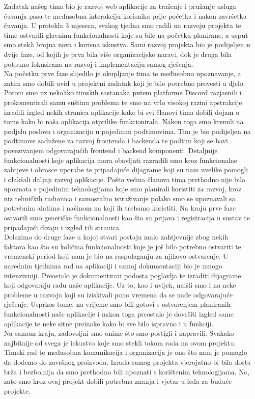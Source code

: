 		Zadatak našeg tima bio je razvoj web aplikacije za traženje i pružanje usluga čuvanja pasa te međusobnu interakciju korisnika prije početka i nakon završetka čuvanja. U protekla 3 mjeseca, svakog tjedna smo radili na razvoju projekta te time ostvarili glavninu funkcionalnosti koje su bile na početku planirane, a usput smo stekli brojna nova i korisna iskustva. Sami razvoj projekta bio je podijeljen u dvije faze, od kojih je prva bila više organizacijske naravi, dok je druga bila potpuno fokusirana na razvoj i implementaciju samog rješenja.\\
		Na početku prve faze slijedilo je okupljanje tima te međusobno upoznavanje, a zatim smo dobili uvid u projektni zadatak koji je bilo potrebno provesti u djelo. Potom smo uz nekoliko timskih sastanaka putem platforme Discord razjasnili i prokomentirali samu suštinu problema te smo na vrlo visokoj razini apstrakcije izradili izgled nekih stranica aplikacije kako bi svi članovi tima dobili dojam o tome kako bi naša aplikacija otprilike funkcionirala. Nakon toga smo krenuli na podjelu poslova i organizaciju u pojedinim podtimovima. Tim je bio podijeljen na podtimove zadužene za razvoj frontenda i backenda te podtim koji se bavi povezivanjem odgovarajućih frontend i backend komponenti. Detaljnije funkcionalnosti koje aplikacija mora obavljati razradili smo kroz funkcionalne zahtjeve i obrasce uporabe te pripadajuće dijagrame koji su nam uvelike pomogli i olakšali daljnji razvoj aplikacije. Pošto većina članova tima prethodno nije bila upoznata s pojedinim tehnologijama koje smo planirali koristiti za razvoj, kroz niz tehničkih radionica i samostalno istraživanje polako smo se upoznavali sa potrebnim alatima i načinom na koji ih trebamo koristiti. Na kraju prve faze ostvarili smo generičke funkcionalnosti kao što su prijava i registracija u sustav te pripadajući dizajn i izgled tih stranica.\\
		Dolazimo do druge faze u kojoj stvari postaju malo zahtjevnije zbog nekih faktora kao što su količina funkcionalnosti koje je još bilo potrebno ostvariti te vremenski period koji nam je bio na raspolaganju za njihovo ostvarenje. U narednim tjednima rad na aplikaciji i samoj dokumentaciji bio je mnogo intenzivniji. Preostalo je dokumentirati podosta poglavlja te izraditi dijagrame koji odgovaraju radu naše aplikacije. Uz to, kao i uvijek, naišli smo i na neke probleme u razvoju koji su iziskivali puno vremena da se nađe odgovarajuće rješenje. Usprkos tome, na vrijeme smo bili gotovi s ostvarenjem planiranih funkcionalnosti naše aplikacije i nakon toga preostalo je dovršiti izgled same aplikacije te neke sitne preinake kako bi sve bilo ispravno i u funkciji.\\
		Na samom kraju, zadovoljni smo onime što smo postigli i napravili. Svakako najbitnije od svega je iskustvo koje smo stekli tokom rada na ovom projektu. Timski rad te međusobna komunikacija i organizacija je ono što nam je pomoglo da dođemo do završnog proizvoda. Izrada samog projekta vjerojatno bi bila dosta brža i bezbolnija da smo prethodno bili upoznati s korištenim tehnologijama. No, zato smo kroz ovaj projekt dobili potrebna znanja i vjetar u leđa za buduće projekte.\\
		
		
		\eject 